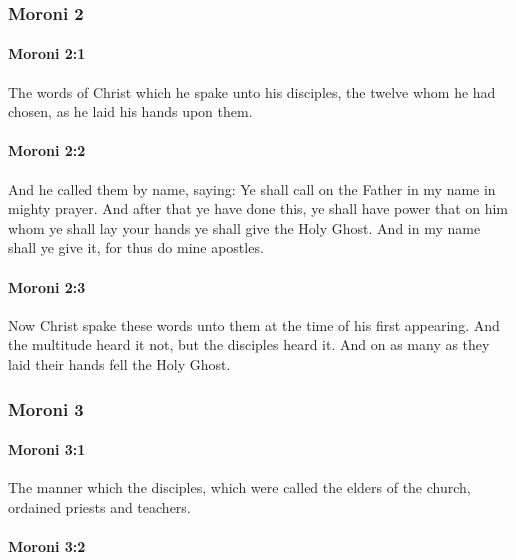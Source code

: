 	\subsubsection{Moroni 2} %
		\label{MORONI-2}
		
		\paragraph{Moroni 2:1} %
			\label{MORONI-2-1}

			The words of Christ which he spake unto his disciples,
			the twelve whom he had chosen,
			as he laid his hands upon them.

		\paragraph{Moroni 2:2} %
			\label{MORONI-2-2}

			And he called them by name, saying:
			Ye shall call on the Father in my name in mighty prayer.
			And after that ye have done this,
			ye shall have power
			that on him whom ye shall lay your hands
			ye shall give the Holy Ghost.
			And in my name shall ye give it,
			for thus do mine apostles.

		\paragraph{Moroni 2:3} %
			\label{MORONI-2-3}

			Now Christ spake these words unto them at the time of his first appearing.
			And the multitude heard it not, but the disciples heard it.
			And on as many as they laid their hands fell the Holy Ghost.

	\subsubsection{Moroni 3} %
		\label{MORONI-3}
		
		\paragraph{Moroni 3:1} %
			\label{MORONI-3-1}

			The manner which the disciples,
			which were called the elders of the church,
			ordained priests and teachers.

		\paragraph{Moroni 3:2} %
			\label{MORONI-3-2}

